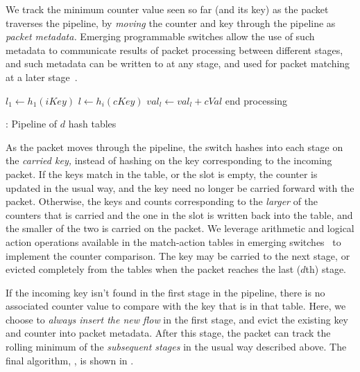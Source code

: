  We track the minimum counter value seen so
far (and its key) as the packet traverses the pipeline, by {\em moving} the
counter and key through the pipeline as {\em packet metadata.} Emerging
programmable switches allow the use of such metadata to communicate results of
packet processing between different stages, and such metadata can be written to
at any stage, and used for packet matching at a later stage~\cite{p4-v1.1-spec}.

\begin{algorithm}
\DontPrintSemicolon %
\;
$l_1 \gets h_1(iKey)$\;
\;
 {
$l \gets h_i(cKey)$\;
   {
    $val_l \gets val_l + cVal$\;
    end processing\;
  }
}
\caption{\TheSystem: Pipeline of $d$ hash tables}
\label{algo:Sequential}
\end{algorithm}

As the packet moves through the pipeline, the switch hashes into each stage on
the {\em carried key,} instead of hashing on the key corresponding to the
incoming packet. If the keys match in the table, or the slot is empty, the
counter is updated in the usual way, and the key need no longer be carried
forward with the packet. Otherwise, the keys and counts corresponding to the
{\em larger} of the counters that is carried and the one in the slot is written
back into the table, and the smaller of the two is carried on the packet. We
leverage arithmetic and logical action operations available in the match-action
tables in emerging switches~\cite{RMT} to implement the counter comparison. The
key may be carried to the next stage, or evicted completely from the tables when
the packet reaches the last (\ie $d$th) stage.

 If the incoming key isn't found in
the first stage in the pipeline, there is no associated counter value to compare
with the key that is in that table. Here, we choose to {\em always insert the
  new flow} in the first stage, and evict the existing key and counter into
packet metadata. After this stage, the packet can track the rolling minimum of
the {\em subsequent stages} in the usual way described above. The final
algorithm, \TheSystem, is shown in .

